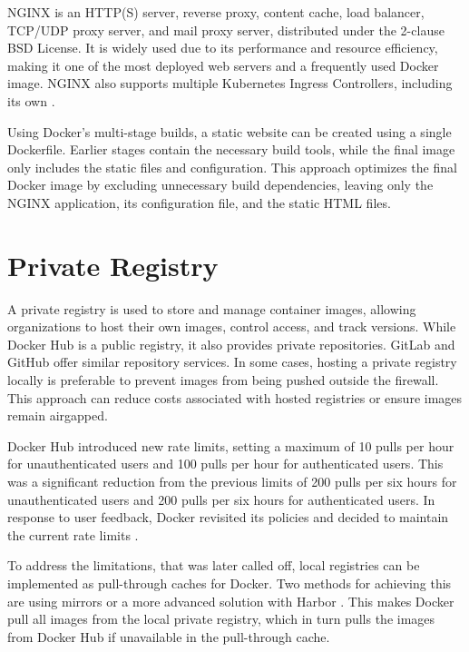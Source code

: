 NGINX is an HTTP(S) server, reverse proxy, content cache, load balancer, TCP/UDP proxy server, and mail proxy server, distributed under the 2-clause BSD License. It is widely used due to its performance and resource efficiency, making it one of the most deployed web servers and a frequently used Docker image. NGINX also supports multiple Kubernetes Ingress Controllers, including its own \Parencite{NginxWebsite}. 

Using Docker's multi-stage builds, a static website can be created using a single Dockerfile. Earlier stages contain the necessary build tools, while the final image only includes the static files and configuration. This approach optimizes the final Docker image by excluding unnecessary build dependencies, leaving only the NGINX application, its configuration file, and the static HTML files.

\section{Private Registry}\label{sec:private_registry}
A private registry is used to store and manage container images, allowing organizations to host their own images, control access, and track versions. While Docker Hub is a public registry, it also provides private repositories. GitLab and GitHub offer similar repository services. In some cases, hosting a private registry locally is preferable to prevent images from being pushed outside the firewall. This approach can reduce costs associated with hosted registries or ensure images remain airgapped.

Docker Hub introduced new rate limits, setting a maximum of 10 pulls per hour for unauthenticated users and 100 pulls per hour for authenticated users. This was a significant reduction from the previous limits of 200 pulls per six hours for unauthenticated users and 200 pulls per six hours for authenticated users. In response to user feedback, Docker revisited its policies and decided to maintain the current rate limits \Parencite{DockerHubPolicies}.

To address the limitations, that was later called off, local registries can be implemented as pull-through caches for Docker. Two methods for achieving this are using mirrors \Parencite{dockerhubmirror} or a more advanced solution with Harbor \Parencite{harbor}. This makes Docker pull all images from the local private registry, which in turn pulls the images from Docker Hub if unavailable in the pull-through cache.

